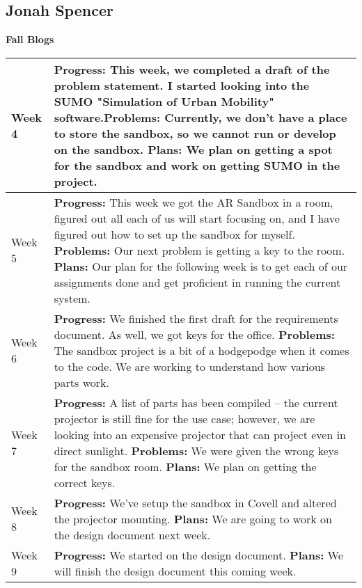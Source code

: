 \documentclass[letterpaper, 10pt, onecolumn, draftclsnofoot]{IEEEtran}
\begin{document}
    \subsection{Jonah Spencer}
        \begin{center}
        \large{\textbf{Fall Blogs}} \\
        \begin{longtable}{|p{4cm}|p{10cm}|}
            \hline
            Week 4 & \textbf{Progress: } This week, we completed a draft of the problem statement. I started looking into the SUMO "Simulation of Urban Mobility" software.\textbf{Problems: } Currently, we don't have a place to store the sandbox, so we cannot run or develop on the sandbox.  \textbf{Plans: } We plan on getting a spot for the sandbox and work on getting SUMO in the project.\\
            \hline
            Week 5 & \textbf{Progress: } This week we got the AR Sandbox in a room, figured out all each of us will start focusing on, and I have figured out how to set up the sandbox for myself. \textbf{Problems:}  Our next problem is getting a key to the room.  \textbf{Plans: } Our plan for the following week is to get each of our assignments done and get proficient in running the current system.\\
            \hline
            Week 6 & \textbf{Progress: } We finished the first draft for the requirements document. As well, we got keys for the office. \textbf{Problems: } The sandbox project is a bit of a hodgepodge when it comes to the code. We are working to understand how various parts work.\\
            \hline
            Week 7 & \textbf{Progress: }  A list of parts has been compiled -- the current projector is still fine for the use case; however, we are looking into an expensive projector that can project even in direct sunlight. \textbf{Problems:}  We were given the wrong keys for the sandbox room. \textbf{Plans: } We plan on getting the correct keys. \\
            \hline
            Week 8 & \textbf{Progress: } We've setup the sandbox in Covell and altered the projector mounting. \textbf{Plans: } We are going to work on the design document next week.\\
            \hline
            Week 9 & \textbf{Progress: } We started on the design document. \textbf{Plans: } We will finish the design document this coming week.\\
            \hline
        \end{longtable}
        \end{center}
    
\end{document}

